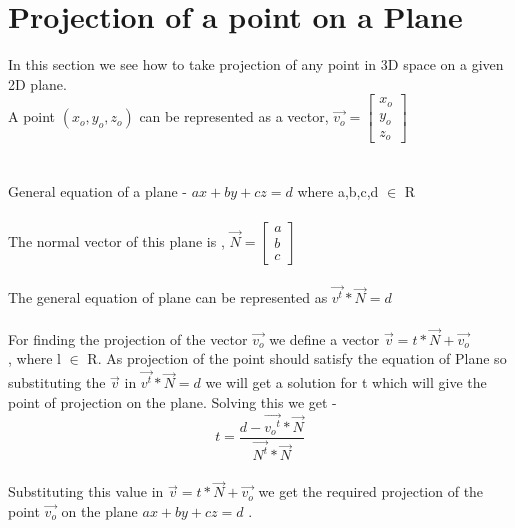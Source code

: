 \documentclass[18pt]{article}
\begin{document}
\section{Projection of a point on a Plane}
\large{In this section we see how to take projection of any point in 3D space on a given 2D plane.\\
A point $(x_{o},y_{o},z_{o})$ can be represented as a vector, $\Vec{v_{o}}=\begin{bmatrix} 
x_{o}\\
y_{o}\\
z_{o}
\end{bmatrix}$\\{}\\{}\\
General equation of a plane -      $ax + by + cz = d  $ where a,b,c,d $\in $ R\\{}\\
The normal vector of this plane is , $\Vec{N}=\begin{bmatrix} 
a\\
b\\
c
\end{bmatrix}$\\{}\\
The general equation of plane can be represented as  \Large{$\Vec{v^t}*\Vec{N} = d $}\\}{}\\
{For finding the projection of the vector $\Vec{v_{o}}$  we define a vector $\Vec{v}= t*\Vec{N} +  \Vec{v_{o}}$\\ , where l $\in $ R.
As projection of the point should satisfy the equation of Plane so substituting the $\Vec{v}$ in $\Vec{v^t}*\Vec{N} = d $ we will get a solution for t which will give the point of projection on the plane.
Solving this we get - $$ t = \dfrac{d - \Vec{{v_{o}}^t} * \Vec{N}}{\Vec{N^t} * \Vec{N}}$$\\
Substituting this value in $\Vec{v}= t*\Vec{N} +  \Vec{v_{o}}$ we get the required projection of the point $\Vec{v_{o}}$ on the plane $ax + by + cz = d  $ .
}
\end{document}
